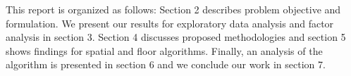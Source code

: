 This report is organized as follows: Section 2 describes problem objective and formulation. We present our results for exploratory data analysis and factor analysis in section 3. Section 4 discusses proposed methodologies and section 5 shows findings for spatial and floor algorithms. Finally, an analysis of the algorithm is presented in section 6 and we conclude our work in section 7.